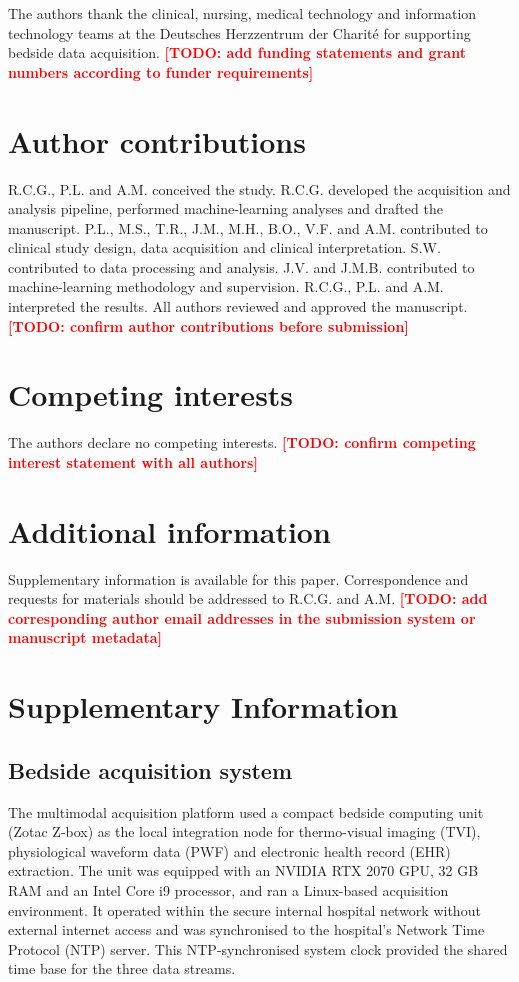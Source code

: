 \documentclass[11pt]{article}
\newcommand{\TODO}[1]{\textbf{\textcolor{red}{[TODO: #1]}}}
\begin{document}
The authors thank the clinical, nursing, medical technology and information technology teams at the Deutsches Herzzentrum der Charit\'{e} for supporting bedside data acquisition. \TODO{add funding statements and grant numbers according to funder requirements}

\section*{Author contributions}

R.C.G., P.L. and A.M. conceived the study. R.C.G. developed the acquisition and analysis pipeline, performed machine-learning analyses and drafted the manuscript. P.L., M.S., T.R., J.M., M.H., B.O., V.F. and A.M. contributed to clinical study design, data acquisition and clinical interpretation. S.W. contributed to data processing and analysis. J.V. and J.M.B. contributed to machine-learning methodology and supervision. R.C.G., P.L. and A.M. interpreted the results. All authors reviewed and approved the manuscript. \TODO{confirm author contributions before submission}

\section*{Competing interests}

The authors declare no competing interests. \TODO{confirm competing interest statement with all authors}

\section*{Additional information}

Supplementary information is available for this paper. Correspondence and requests for materials should be addressed to R.C.G. and A.M. \TODO{add corresponding author email addresses in the submission system or manuscript metadata}

\clearpage
\section*{Supplementary Information}

\subsection*{Bedside acquisition system}

The multimodal acquisition platform used a compact bedside computing unit (Zotac Z-box) as the local integration node for thermo-visual imaging (TVI), physiological waveform data (PWF) and electronic health record (EHR) extraction. The unit was equipped with an NVIDIA RTX 2070 GPU, 32 GB RAM and an Intel Core i9 processor, and ran a Linux-based acquisition environment. It operated within the secure internal hospital network without external internet access and was synchronised to the hospital's Network Time Protocol (NTP) server. This NTP-synchronised system clock provided the shared time base for the three data streams.
\end{document}
